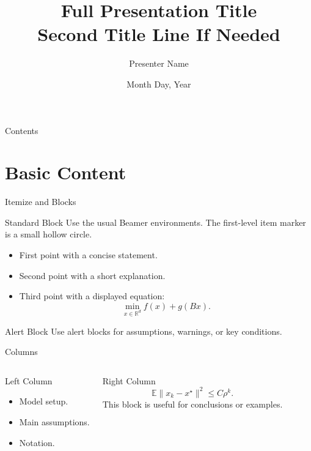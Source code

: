 \documentclass[aspectratio=169]{beamer}
\title[Short Presentation Title]{Full Presentation Title\\Second Title Line If Needed}
\author[Presenter]{Presenter Name}
\institute[Short Institute]{Department or School, University Name}
\date{Month Day, Year}
\newcommand{\RR}{\mathbb{R}}
\newcommand{\E}{\mathbb{E}}
\begin{document}
\begin{frame}
  \titlepage
\end{frame}

\begin{frame}{Contents}
  \tableofcontents
\end{frame}

\section{Basic Content}

\begin{frame}{Itemize and Blocks}
\begin{block}{Standard Block}
Use the usual Beamer environments. The first-level item marker is a small hollow circle.
\end{block}

\begin{itemize}
  \item First point with a concise statement.
  \item Second point with a short explanation.
  \item Third point with a displayed equation:
  \[
    \min_{x\in\RR^d} f(x)+g(Bx).
  \]
\end{itemize}

\begin{alertblock}{Alert Block}
Use alert blocks for assumptions, warnings, or key conditions.
\end{alertblock}
\end{frame}

\begin{frame}{Columns}
\begin{columns}[T,onlytextwidth]
\begin{block}{Left Column}
\begin{itemize}
  \item Model setup.
  \item Main assumptions.
  \item Notation.
\end{itemize}
\end{block}

\begin{exampleblock}{Right Column}
\[
  \E\|x_k-x^\star\|^2 \le C\rho^k.
\]
This block is useful for conclusions or examples.
\end{exampleblock}
\end{columns}
\end{frame}
\end{document}
